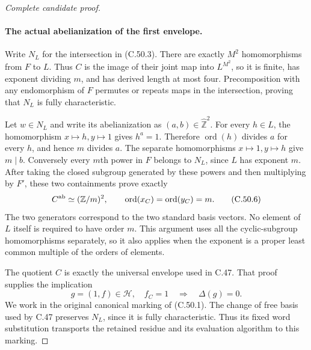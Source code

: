 \begin{proof}[Complete candidate proof]
\paragraph{The actual abelianization of the first envelope.}
Write $N_L$ for the intersection in (C.50.3).
There are exactly $M^2$ homomorphisms from $F$ to $L$.
Thus $C$ is the image of their joint map into $L^{M^2}$, so it is
finite, has exponent dividing $m$, and has derived length at most
four. Precomposition with any endomorphism of $F$ permutes or
repeats maps in the intersection, proving that $N_L$ is fully
characteristic.

Let $w\in N_L$ and write its abelianization as $(a,b)\in
\widehat{\mathbb Z}^2$. For every $h\in L$, the homomorphism
$x\mapsto h,y\mapsto1$ gives $h^a=1$. Therefore
$\operatorname{ord}(h)$ divides $a$ for every $h$, and hence
$m$ divides $a$. The separate homomorphisms
$x\mapsto1,y\mapsto h$ give $m\mid b$.
Conversely every $m$th power in $F$ belongs to $N_L$, since
$L$ has exponent $m$. After taking the closed subgroup generated
by these powers and then multiplying by $F'$, these two containments
prove exactly
\[
                     C^{\rm ab}\simeq (\mathbb Z/m)^2,
       \qquad \operatorname{ord}(x_C)
              =\operatorname{ord}(y_C)=m.             \tag{C.50.6}
\]
The two generators correspond to the two standard basis vectors.
No element of $L$ itself is required to have order $m$.
This argument uses all the cyclic-subgroup homomorphisms separately,
so it also applies when the exponent is a proper least common multiple
of the orders of elements.

The quotient $C$ is exactly the universal envelope used in C.47.
That proof supplies the implication
\[
          g=(1,f)\in\mathcal H,\quad f_C=1
                         \quad\Longrightarrow\quad \Delta(g)=0.
                                                               \tag{C.50.7}
\]
We work in the original canonical marking of (C.50.1).
The change of free basis used by C.47 preserves $N_L$, since it
is fully characteristic. Thus its fixed word substitution transports
the retained residue and its evaluation algorithm to this marking.


\end{proof}
